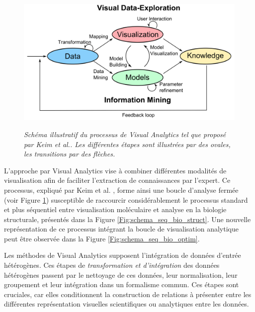 \begin{figure}
  \centering
  {\includegraphics[width=.75\linewidth]{./figures/ch4/visual_analytics_process_keim}}
    \caption[Schéma du processus de \textit{Visual Analytics} proposé par Keim \textit{et al.}.]{{\it Schéma illustratif du processus de Visual Analytics tel que proposé par Keim \textit{et al.}. Les différentes étapes sont illustrées par des ovales, les transitions par des flèches.}}
  \label{Fig:visual_analytics_process_keim}
  \hspace{0.3cm}
\end{figure}

L'approche par Visual Analytics vise à combiner différentes modalités de visualisation afin de faciliter l'extraction de connaissances par l'expert. Ce processus, expliqué par Keim et al. \cite{keim2010mastering}, forme ainsi une boucle d'analyse fermée (voir Figure \ref{Fig:visual_analytics_process_keim}) susceptible de raccourcir considérablement le processus standard et plus séquentiel entre visualisation moléculaire et analyse en la biologie structurale, présentés dans la Figure \ref{Fig:schema_seq_bio_struct}. Une nouvelle représentation de ce processus intégrant la boucle de visualisation analytique peut être observée dans la Figure \ref{Fig:schema_seq_bio_optim}. %

Les méthodes de Visual Analytics supposent l'intégration de données d'entrée hétérogènes. Ces étapes de \textit{transformation et d'intégration} des données hétérogènes passent par le nettoyage de ces données, leur normalisation, leur groupement et leur intégration dans un formalisme commun. Ces étapes sont cruciales, car elles conditionnent la construction de relations à présenter entre les différentes représentation visuelles scientifiques ou analytiques entre les données. 


